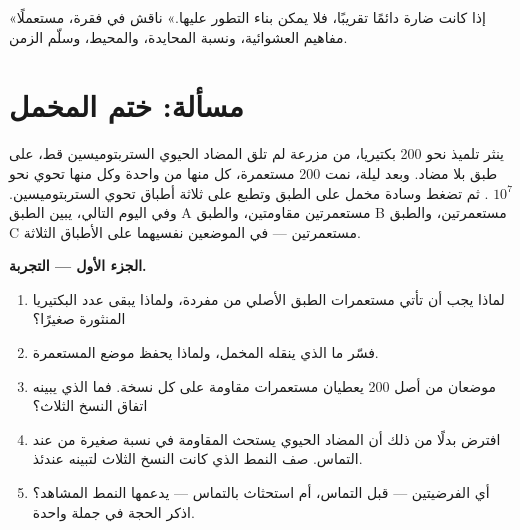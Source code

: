 \begin{exercise}[$\star\star\star$]\label{exo:g11:mutations:15}
«إذا كانت  ضارة دائمًا تقريبًا، فلا يمكن بناء التطور عليها.»
ناقش في فقرة، مستعملًا مفاهيم العشوائية، ونسبة  المحايدة،
والمحيط، وسلّم الزمن.
\end{exercise}

\section{مسألة: ختم المخمل}

\begin{problem}
\label{pb:g11:mutations:1}
ينثر تلميذ نحو 200 بكتيريا، من مزرعة لم تلق المضاد الحيوي
الستربتوميسين قط، على طبق بلا مضاد. وبعد ليلة، نمت 200 مستعمرة، كل
منها من  واحدة وكل منها تحوي نحو $10^7$ . ثم تضغط وسادة مخمل
على الطبق وتطبع على ثلاثة أطباق تحوي الستربتوميسين. وفي اليوم التالي،
يبين الطبق A مستعمرتين مقاومتين، والطبق B مستعمرتين، والطبق C
مستعمرتين --- في الموضعين نفسيهما على الأطباق الثلاثة.

\medskip
\noindent\textbf{الجزء الأول --- التجربة.}
\begin{enumerate}
  \item لماذا يجب أن تأتي مستعمرات الطبق الأصلي من  مفردة، ولماذا
        يبقى عدد البكتيريا المنثورة صغيرًا؟
  \item فسّر ما الذي ينقله المخمل، ولماذا يحفظ موضع المستعمرة.
  \item موضعان من أصل 200 يعطيان مستعمرات مقاومة على كل نسخة. فما الذي
        يبينه اتفاق النسخ الثلاث؟
  \item افترض بدلًا من ذلك أن المضاد الحيوي يستحث المقاومة في نسبة
        صغيرة من  عند التماس. صف النمط الذي كانت النسخ الثلاث
        لتبينه عندئذ.
  \item أي الفرضيتين ---  قبل التماس، أم استحثاث بالتماس ---
        يدعمها النمط المشاهد؟ اذكر الحجة في جملة واحدة.
\end{enumerate}


\end{problem}
